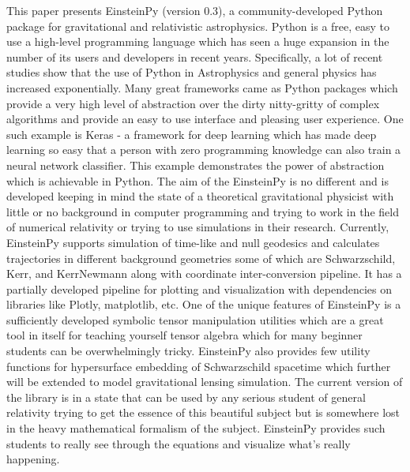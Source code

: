 \documentclass[onecolumn]{aa}
\begin{document}
   \date{Received May 04, 2020; accepted May 04, 2020}

 
  \abstract
{This paper presents EinsteinPy (version 0.3), a community-developed Python package for gravitational and relativistic astrophysics. Python is a free, easy to use a high-level programming language which has seen a huge expansion in the number of its users and developers in recent years. Specifically, a lot of recent studies show that the use of Python in Astrophysics and general physics has increased exponentially. Many great frameworks came as Python packages which provide a very high level of abstraction over the dirty nitty-gritty of complex algorithms and provide an easy to use interface and pleasing user experience. One such example is Keras - a framework for deep learning which has made deep learning so easy that a person with zero programming knowledge can also train a neural network classifier. This example demonstrates the power of abstraction which is achievable in Python. The aim of the EinsteinPy is no different and is developed keeping in mind the state of a theoretical gravitational physicist with little or no background in computer programming and trying to work in the field of numerical relativity or trying to use simulations in their research. Currently, EinsteinPy supports simulation of time-like and null geodesics and calculates trajectories in different background geometries some of which are Schwarzschild, Kerr, and KerrNewmann along with coordinate inter-conversion pipeline. It has a partially developed pipeline for plotting and visualization with dependencies on libraries like Plotly, matplotlib, etc. One of the unique features of EinsteinPy is a sufficiently developed symbolic tensor manipulation utilities which are a great tool in itself for teaching yourself tensor algebra which for many beginner students can be overwhelmingly tricky. EinsteinPy also provides few utility functions for hypersurface embedding of Schwarzschild spacetime which further will be extended to model gravitational lensing simulation. The current version of the library is in a state that can be used by any serious student of general relativity trying to get the essence of this beautiful subject but is somewhere lost in the heavy mathematical formalism of the subject. EinsteinPy provides such students to really see through the equations and visualize what's really happening.}

\end{document}
